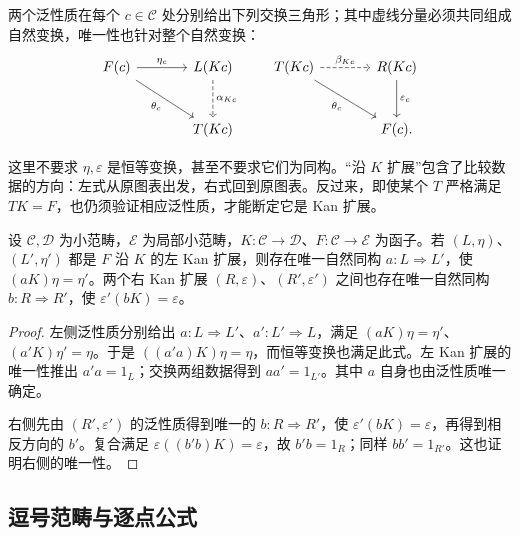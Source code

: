 两个泛性质在每个 \(c\in\mathcal C\) 处分别给出下列交换三角形；其中虚线分量必须共同组成自然变换，唯一性也针对整个自然变换：
\[
	\begin{tikzcd}[column sep=large,row sep=large]
		F(c)\arrow[r,"\eta_c"]\arrow[dr,"\theta_c"']&
		L(Kc)\arrow[d,dashed,"\alpha_{Kc}"]\\
		&T(Kc)
	\end{tikzcd}
	\qquad
	\begin{tikzcd}[column sep=large,row sep=large]
		T(Kc)\arrow[r,dashed,"\beta_{Kc}"]\arrow[dr,"\theta_c"']&
		R(Kc)\arrow[d,"\varepsilon_c"]\\
		&F(c).
	\end{tikzcd}
\]

这里不要求 \(\eta,\varepsilon\) 是恒等变换，甚至不要求它们为同构。“沿 \(K\) 扩展”包含了比较数据的方向：左式从原图表出发，右式回到原图表。反过来，即使某个 \(T\) 严格满足 \(TK=F\)，也仍须验证相应泛性质，才能断定它是 Kan 扩展。

\begin{proposition}[保持比较数据的唯一性]\label{b4:prop:kan-extension-uniqueness}
	设 \(\mathcal C,\mathcal D\) 为小范畴，\(\mathcal E\) 为局部小范畴，\(K:\mathcal C\rightarrow\mathcal D\)、\(F:\mathcal C\rightarrow\mathcal E\) 为函子。若 \((L,\eta)\)、\((L',\eta')\) 都是 \(F\) 沿 \(K\) 的左 Kan 扩展，则存在唯一自然同构 \(a:L\Rightarrow L'\)，使 \((aK)\eta=\eta'\)。两个右 Kan 扩展 \((R,\varepsilon)\)、\((R',\varepsilon')\) 之间也存在唯一自然同构 \(b:R\Rightarrow R'\)，使 \(\varepsilon'(bK)=\varepsilon\)。
\end{proposition}
\begin{proof}
	左侧泛性质分别给出 \(a:L\Rightarrow L'\)、\(a':L'\Rightarrow L\)，满足 \((aK)\eta=\eta'\)、\((a'K)\eta'=\eta\)。于是 \(((a'a)K)\eta=\eta\)，而恒等变换也满足此式。左 Kan 扩展的唯一性推出 \(a'a=1_L\)；交换两组数据得到 \(aa'=1_{L'}\)。其中 \(a\) 自身也由泛性质唯一确定。

	右侧先由 \((R',\varepsilon')\) 的泛性质得到唯一的 \(b:R\Rightarrow R'\)，使 \(\varepsilon'(bK)=\varepsilon\)，再得到相反方向的 \(b'\)。复合满足 \(\varepsilon((b'b)K)=\varepsilon\)，故 \(b'b=1_R\)；同样 \(bb'=1_{R'}\)。这也证明右侧的唯一性。
\end{proof}

\subsection{逗号范畴与逐点公式}
\label{b4:subsec:0305:02}

